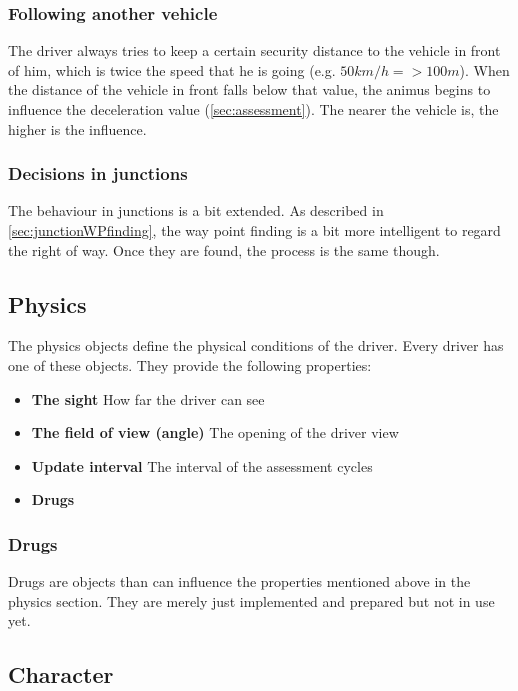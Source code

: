 \subsubsection{Following another vehicle}

The driver always tries to keep a certain security distance to the
vehicle in front of him, which is twice the speed that he is going (e.g. $ 50 km/h => 100m$).
When the distance of the vehicle in front falls below that value, the
animus begins to influence the deceleration value (\ref{sec:assessment}).
The nearer the vehicle is, the higher is the influence.

\subsubsection{Decisions in junctions}

The behaviour in junctions is a bit extended. As described in 
\ref{sec:junctionWPfinding}, the way point finding is a bit more intelligent
to regard the right of way. Once they are found, the process is the same
though.

\subsection{Physics}
\label{sec:physics}

The physics objects define the physical conditions of the driver. Every
driver has one of these objects. They provide the following properties:

\begin{itemize}
\item \textbf{The sight} How far the driver can see
\item \textbf{The field of view (angle)} The opening of the driver view
\item \textbf{Update interval} The interval of the assessment cycles
\item \textbf{Drugs}
\end{itemize}

\subsubsection{Drugs}
\label{sec:drugs}

Drugs are objects than can influence the properties mentioned above in the
physics section. They are merely just implemented and prepared but not 
in use yet.

\subsection{Character}
\label{sec:character}

